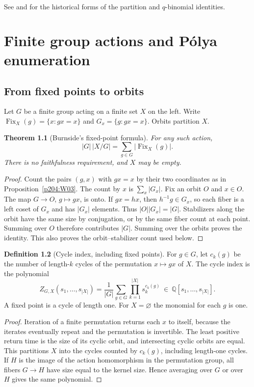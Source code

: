 \documentclass[11pt,oneside,openany]{book}
\theoremstyle{plain}
\newtheorem{theorem}{Theorem}[chapter]
\theoremstyle{definition}
\newtheorem{definition}[theorem]{Definition}
\theoremstyle{remark}
\begin{document}
See \cite[Sections 1.7--1.8]{Stanley} and \cite{Postnikov} for
the historical forms of the partition and \(q\)-binomial identities.
\chapter[Group actions and Pólya counting]{Finite group actions and Pólya enumeration}
\label{p204:ch05}

\section{From fixed points to orbits}

Let \(G\) be a finite group acting on a finite set \(X\) on the left.
Write \(\operatorname{Fix}_X(g)=\{x:gx=x\}\) and
\(G_x=\{g:gx=x\}\). Orbits partition \(X\).

\begin{theorem}[Burnside's fixed-point formula]\label{p204:W30}
For any such action,
\[
 |G|\,|X/G|=\sum_{g\in G}|\operatorname{Fix}_X(g)|.
\]
There is no faithfulness requirement, and \(X\) may be empty.
\end{theorem}
\begin{proof}
Count the pairs \((g,x)\) with \(gx=x\) by their two coordinates
as in Proposition~\ref{p204:W03}. The count by \(x\) is
\(\sum_x|G_x|\). Fix an orbit \(O\) and \(x\in O\).
The map \(G\to O\), \(g\mapsto gx\), is onto. If \(gx=hx\),
then \(h^{-1}g\in G_x\), so each fiber is a left coset of
\(G_x\) and has \(|G_x|\) elements. Thus \(|O||G_x|=|G|\).
Stabilizers along the orbit have the same size by conjugation,
or by the same fiber count at each point. Summing over \(O\)
therefore contributes \(|G|\). Summing over the orbits proves the
identity. This also proves the orbit--stabilizer count used below.
\end{proof}

\begin{definition}[Cycle index, including fixed points]\label{p204:W31}
For \(g\in G\), let \(c_k(g)\) be the number of length-\(k\)
cycles of the permutation \(x\mapsto gx\) of \(X\).
The cycle index is the polynomial
\[
 Z_{G,X}(s_1,\ldots,s_{|X|})
  =\frac1{|G|}\sum_{g\in G}\prod_{k=1}^{|X|}s_k^{c_k(g)}
  \ \in\ \mathbb Q[s_1,\ldots,s_{|X|}].
\]
A fixed point is a cycle of length one. For \(X=\varnothing\)
the monomial for each \(g\) is one.
\end{definition}

\begin{proof}
Iteration of a finite permutation returns each \(x\) to itself,
because the iterates eventually repeat and the permutation is
invertible. The least positive return time is the size of its
cyclic orbit, and intersecting cyclic orbits are equal.
This partitions \(X\) into the cycles counted by \(c_k(g)\),
including length-one cycles. If \(H\) is the image of the action
homomorphism in the permutation group, all fibers \(G\to H\)
have size equal to the kernel size. Hence averaging over \(G\)
or over \(H\) gives the same polynomial.
\end{proof}
\end{document}
